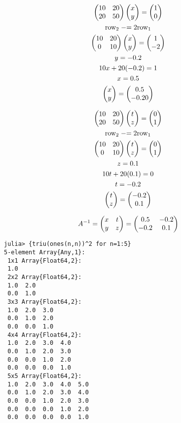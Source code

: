 \documentclass{mshw}
\begin{document}
\newpage
{}
\begin{gather*}
\begin{pmatrix} 10 & 20 \\ 20 & 50 \end{pmatrix} \begin{pmatrix} x \\ y \end{pmatrix} = \begin{pmatrix} 1 \\ 0 \end{pmatrix}
\\
\text{row}_2 \mathrel{{-}{=}} 2 \text{row}_1
\\
\begin{pmatrix} 10 & 20 \\ 0 & 10 \end{pmatrix} \begin{pmatrix} x \\ y \end{pmatrix} = \begin{pmatrix} 1 \\ -2 \end{pmatrix}
\\
y = -0.2 \\
10 x + 20 (-0.2) = 1 \\
x = 0.5 \\
\begin{pmatrix} x \\ y \end{pmatrix} = \begin{pmatrix} 0.5 \\ -0.2 0\end{pmatrix}
\end{gather*}

\begin{gather*}
\begin{pmatrix} 10 & 20 \\ 20 & 50 \end{pmatrix} \begin{pmatrix} t \\ z \end{pmatrix} = \begin{pmatrix} 0 \\ 1 \end{pmatrix}
\\
\text{row}_2 \mathrel{{-}{=}} 2 \text{row}_1
\\
\begin{pmatrix} 10 & 20 \\ 0 & 10 \end{pmatrix} \begin{pmatrix} t \\ z \end{pmatrix} = \begin{pmatrix} 0 \\ 1 \end{pmatrix}
\\
z = 0.1 \\
10 t + 20 (0.1) = 0 \\
t = -0.2 \\
\begin{pmatrix} t \\ z \end{pmatrix} = \begin{pmatrix} -0.2 \\ 0.1 \end{pmatrix}
\end{gather*}

\begin{gather*}
A^{-1} = \begin{pmatrix} x & t \\ y & z \end{pmatrix} = \begin{pmatrix} 0.5 & -0.2 \\ -0.2 & 0.1 \end{pmatrix}
\end{gather*}


\newpage
{}

\newpage
{}
\begin{lstlisting}
julia> {triu(ones(n,n))^2 for n=1:5}
5-element Array{Any,1}:
 1x1 Array{Float64,2}:
 1.0
 2x2 Array{Float64,2}:
 1.0  2.0
 0.0  1.0
 3x3 Array{Float64,2}:
 1.0  2.0  3.0
 0.0  1.0  2.0
 0.0  0.0  1.0
 4x4 Array{Float64,2}:
 1.0  2.0  3.0  4.0
 0.0  1.0  2.0  3.0
 0.0  0.0  1.0  2.0
 0.0  0.0  0.0  1.0
 5x5 Array{Float64,2}:
 1.0  2.0  3.0  4.0  5.0
 0.0  1.0  2.0  3.0  4.0
 0.0  0.0  1.0  2.0  3.0
 0.0  0.0  0.0  1.0  2.0
 0.0  0.0  0.0  0.0  1.0
\end{lstlisting}
\end{document}
